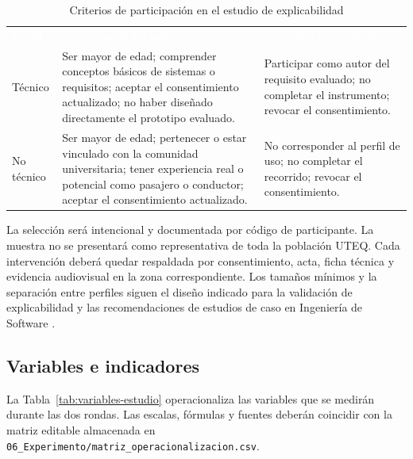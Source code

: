 \documentclass[12pt,a4paper]{article}
\begin{document}
\begin{table}[H]
\centering
\caption{Criterios de participación en el estudio de explicabilidad}
\label{tab:criterios-participantes}
\small
{}
\begin{tabularx}{\textwidth}{L{3.45cm} Y Y}
\textcolor{white}{\textbf{Perfil}} &
\textcolor{white}{\textbf{Criterios de inclusión}} &
\textcolor{white}{\textbf{Criterios de exclusión}}\\
Técnico & Ser mayor de edad; comprender conceptos básicos de sistemas o requisitos; aceptar el consentimiento actualizado; no haber diseñado directamente el prototipo evaluado. & Participar como autor del requisito evaluado; no completar el instrumento; revocar el consentimiento.\\
No técnico & Ser mayor de edad; pertenecer o estar vinculado con la comunidad universitaria; tener experiencia real o potencial como pasajero o conductor; aceptar el consentimiento actualizado. & No corresponder al perfil de uso; no completar el recorrido; revocar el consentimiento.\\
\end{tabularx}
\end{table}

La selección será intencional y documentada por código de participante. La muestra no se presentará como representativa de toda la población UTEQ. Cada intervención deberá quedar respaldada por consentimiento, acta, ficha técnica y evidencia audiovisual en la zona correspondiente. Los tamaños mínimos y la separación entre perfiles siguen el diseño indicado para la validación de explicabilidad y las recomendaciones de estudios de caso en Ingeniería de Software \cite{runeson2009,wohlin2012}.

\subsection{Variables e indicadores}

La Tabla~\ref{tab:variables-estudio} operacionaliza las variables que se medirán durante las dos rondas. Las escalas, fórmulas y fuentes deberán coincidir con la matriz editable almacenada en \nolinkurl{06_Experimento/matriz_operacionalizacion.csv}.
\end{document}
